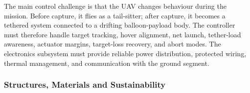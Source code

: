 The main control challenge is that the UAV changes behaviour during the mission. Before capture, it flies as a tail-sitter; after capture, it becomes a tethered system connected to a drifting balloon-payload body. The controller must therefore handle target tracking, hover alignment, net launch, tether-load awareness, actuator margins, target-loss recovery, and abort modes. The electronics subsystem must provide reliable power distribution, protected wiring, thermal management, and communication with the ground segment.

\subsubsection{Structures, Materials and Sustainability}
\label{subsubsec:concept_a_structures_materials_sustainability}









